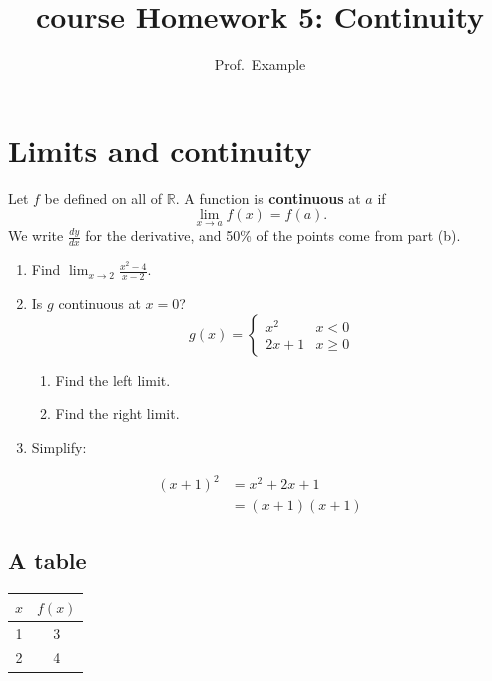 \documentclass[11pt]{article}
\title{course Homework 5: Continuity}
\author{Prof.~Example}
\newcommand{\R}{\mathbb{R}}
\newcommand{\dd}[2]{\frac{d #1}{d #2}}
\begin{document}
\maketitle

\section{Limits and continuity} %
Let $f$ be defined on all of $\R$. A function is \textbf{continuous} at $a$ if
\[
  \lim_{x \to a} f(x) = f(a).
\]
We write $\dd{y}{x}$ for the derivative, and 50\% of the points come from part (b).

\begin{enumerate}
  \item Find $\lim_{x \to 2} \frac{x^2 - 4}{x - 2}$.
  \item Is $g$ continuous at $x = 0$?
  \begin{equation*}
    g(x) = \begin{cases} x^2 & x < 0 \\ 2x + 1 & x \ge 0 \end{cases}
  \end{equation*}
  \begin{enumerate}
    \item Find the left limit.
    \item Find the right limit.
  \end{enumerate}
  \item Simplify:
\end{enumerate}

\begin{align*}
  (x+1)^2 &= x^2 + 2x + 1 \\
          &= (x+1)(x+1) \label{eq:square}
\end{align*}

\subsection*{A table}
\begin{tabular}{|c|c|}
\hline
$x$ & $f(x)$ \\ \hline
1 & 3 \\
2 & 4 \\ \hline
\end{tabular}

\end{document}
